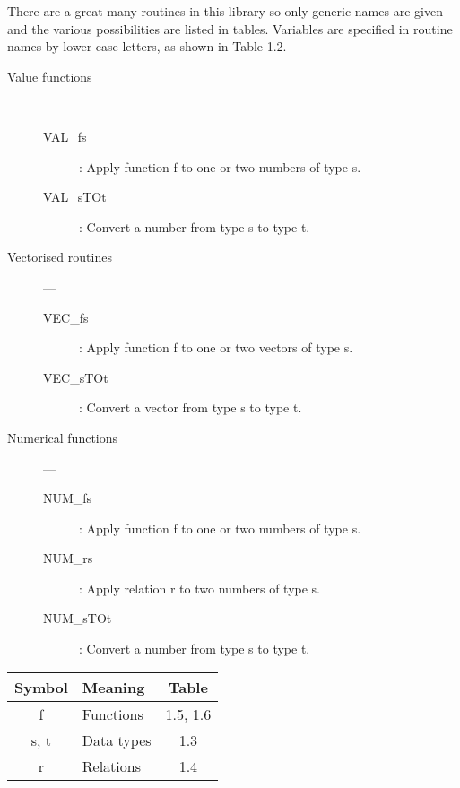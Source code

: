 There are a great many routines in this library so only generic names are given
and the various possibilities are listed in tables.
Variables are specified in routine names by lower-case letters, as shown in
Table 1.2.

\begin{description}

\item [Value functions] ---

\begin{description}
\item [VAL\_fs] : Apply function f to one or two numbers of type s.
\item [VAL\_sTOt] : Convert a number from type s to type t.
\end{description}

\item [Vectorised routines] ---

\begin{description}
\item [VEC\_fs] : Apply function f to one or two vectors of type s.
\item [VEC\_sTOt] : Convert a vector from type s to type t.
\end{description}

\item [Numerical functions] ---

\begin{description}
\item [NUM\_fs] : Apply function f to one or two numbers of type s.
\item [NUM\_rs] : Apply relation r to two numbers of type s.
\item [NUM\_sTOt] : Convert a number from type s to type t.
\end{description}

\end{description}

\vspace*{5mm}

\begin{center}
\begin{tabular}{|c|l|c|}
\hline
{\bf Symbol } & {\bf Meaning } & { Table } \\
\hline
f    & Functions  & 1.5, 1.6 \\
s, t & Data types & 1.3      \\
r    & Relations  & 1.4      \\
\hline
\end{tabular}
\end{center}

